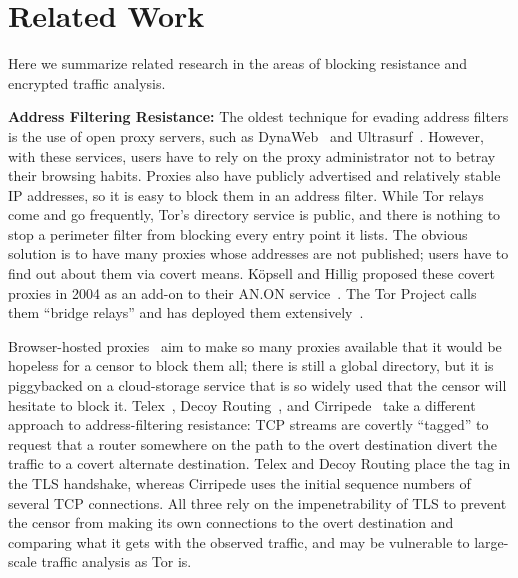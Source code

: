 \section{Related Work}\label{s:relwork}

Here we summarize related research in the areas of blocking resistance
and encrypted traffic analysis.

\smallskip\noindent\textbf{Address Filtering Resistance:} The oldest
technique for evading address filters is the use of open proxy
servers, such as DynaWeb~\cite{c-dynaweb} and
Ultrasurf~\cite{c-ultrasurf}.  However, with these services, users
have to rely on the proxy administrator not to betray their browsing
habits.  Proxies also have publicly advertised and relatively stable IP
addresses, so it is easy to block them in an address filter. While Tor
relays come and go frequently, Tor's directory service is public, and
there is nothing to stop a perimeter filter from blocking every
entry point it lists.  The obvious solution is to have many proxies
whose addresses are not published; users have to find out about them
via covert means.  K\"opsell and Hillig proposed these covert proxies
in 2004 as an add-on to their AN.ON service~\cite{c-anon-br}.  The Tor
Project calls them “bridge relays” and has deployed them
extensively~\cite{s-tor-bridge,c-tor-br}.

Browser-hosted proxies~\cite{c-browser-proxies} aim to make so many
proxies available that it would be hopeless for a censor to block them
all; there is still a global directory, but it is piggybacked on a
cloud-storage service that is so widely used that the censor will
hesitate to block it.  Telex~\cite{c-telex}, Decoy
Routing~\cite{c-decoy-route}, and Cirripede~\cite{c-cirripede} take a
different approach to address-filtering resistance: TCP streams are
covertly “tagged” to request that a router somewhere on the path to
the overt destination divert the traffic to a covert alternate
destination.  Telex and Decoy Routing place the tag in the TLS
handshake, whereas Cirripede uses the initial sequence numbers of
several TCP connections.  All three rely on the impenetrability of TLS
to prevent the censor from making its own connections to the overt
destination and comparing what it gets with the observed traffic, and
may be vulnerable to large-scale traffic analysis as Tor is.


